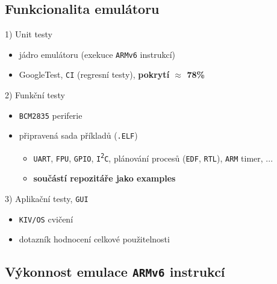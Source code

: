 \documentclass[compress]{beamer}
\begin{document}
\subsection{Funkcionalita emulátoru}

\begin{frame}
	\begin{block}{1) Unit testy}
		\begin{itemize}
			\item jádro emulátoru (exekuce \texttt{ARMv6} instrukcí)
			\item GoogleTest, \texttt{CI} (regresní testy), \textbf{pokrytí $\approx$ 78\%}
		\end{itemize}
	\end{block}
	\begin{block}{2) Funkční testy}
		\begin{itemize}
			\item \texttt{BCM2835} periferie
			\item připravená sada příkladů (\texttt{.ELF})
			\begin{itemize}
				\item \texttt{UART}, \texttt{FPU}, \texttt{GPIO}, \texttt{I\textsuperscript{2}C}, plánování procesů (\texttt{EDF}, \texttt{RTL}), \texttt{ARM} timer, ...
				\item \textbf{součástí repozitáře jako examples}
			\end{itemize}
		\end{itemize}
	\end{block}
	\begin{block}{3) Aplikační testy, \texttt{GUI}}
		\begin{itemize}
			\item \texttt{KIV/OS} cvičení
			\item dotazník hodnocení celkové použitelnosti
		\end{itemize}
	\end{block}
\end{frame}

\subsection{Výkonnost emulace \texttt{ARMv6} instrukcí}
\end{document}
